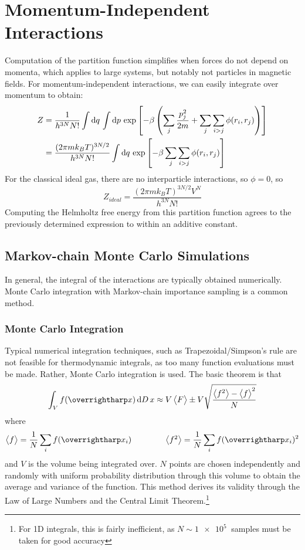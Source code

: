 \section{Momentum-Independent Interactions}
Computation of the partition function simplifies when forces do not depend on momenta, which applies to large systems, but notably not particles in magnetic fields. For momentum-independent interactions, we can easily integrate over momentum to obtain:
\begin{align*}
	Z &= \frac{1}{h^{3N}N!}\int\d{q}\int\d{p}\exp\left[-\beta\left(\sum_j\frac{p^2_j}{2m}+\sum_j\sum_{i>j}\phi(r_i, r_j)\right)\right]\\
	  &=\frac{(2\pi m k_B T)^{3N/2}}{h^{3N}N!}\int\d{q}\exp\left[-\beta\sum_j\sum_{i>j}\phi(r_i, r_j)\right]
\end{align*}
For the classical ideal gas, there are no interparticle interactions, so \(\phi = 0\), so
\begin{equation}
	Z_{ideal} = \frac{(2\pi m k_B T)^{3N/2}V^N}{h^{3N}N!}
\end{equation}
Computing the Helmholtz free energy from this partition function agrees to the previously determined expression to within an additive constant.

\subsection{Markov-chain Monte Carlo Simulations}
In general, the integral of the interactions are typically obtained numerically. Monte Carlo integration with Markov-chain importance sampling is a common method.
\subsubsection{Monte Carlo Integration}
Typical numerical integration techniques, such as Trapezoidal/Simpson's rule are not feasible for thermodynamic integrals, as too many function evaluations must be made. Rather, Monte Carlo integration is used. The basic theorem is that
\[\int_V f(\vv x) \d{D}x \approx V\vect F \pm V \sqrt{\frac{\vect{f^2}-\vect{f}^2}{N}}\]
where
\[\vect{f} = \frac{1}{N}\sum_i f(\vv{ x}_i) \qquad \qquad \vect{f^2} =\frac{1}{N} \sum_i f(\vv {x}_i)^2\]
and \(V\) is the volume being integrated over. \(N\) points are chosen independently and randomly with uniform probability distribution through this volume to obtain the average and variance of the function. This method derives its validity through the Law of Large Numbers and the Central Limit Theorem.\footnote{For 1D integrals, this is fairly inefficient, as \(N\sim \SI{1e5}{}\) samples must be taken for good accuracy}

